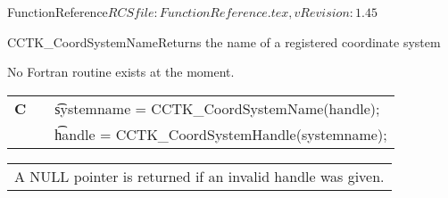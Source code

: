 \begin{cactuspart}{5}{FunctionReference}{$RCSfile: FunctionReference.tex,v $}{$Revision: 1.45 $}
\begin{CCTKFunc}{CCTK\_CoordSystemName}{Returns the name of a registered coordinate system}
\label{CCTK-CoordSystemName}
\showcargs
\begin{params}
\end{params}
\begin{discussion}
No Fortran routine exists at the moment.
\end{discussion}
\begin{examples}
\begin{tabular}{@{}p{3cm}cp{11cm}}
\hfill {\bf C} && {\t systemname = CCTK\_CoordSystemName(handle);}
\\
\hfill         && {\t handle =  CCTK\_CoordSystemHandle(systemname);}
\end{tabular}
\end{examples}
\begin{errorcodes}
\begin{tabular}{l}
A NULL pointer is returned if an invalid handle was given.
\end{tabular}
\end{errorcodes}
\end{CCTKFunc}



\end{cactuspart}
